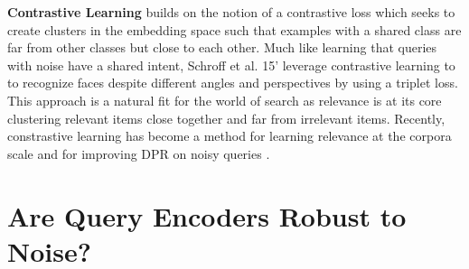 \textbf{Contrastive Learning} builds on the notion of a contrastive loss \cite{Chopra2005LearningAS} which seeks to create clusters in the embedding space such that examples with a shared class are far from other classes but close to each other. Much like learning that queries with noise have a shared intent, Schroff et al. 15' leverage contrastive learning to to recognize faces despite different angles and perspectives \cite{Schroff2015FaceNetAU} by using a triplet loss. This approach is a natural fit for the world of search as relevance is at its core clustering relevant items close together and far from irrelevant items. Recently, constrastive learning has become a method for learning relevance at the corpora scale \cite{Xiong2021ApproximateNN} and for improving DPR on noisy queries \cite{Sidiropoulos2022AnalysingTR}.
\section{Are Query Encoders Robust to Noise?}
\label{create}

